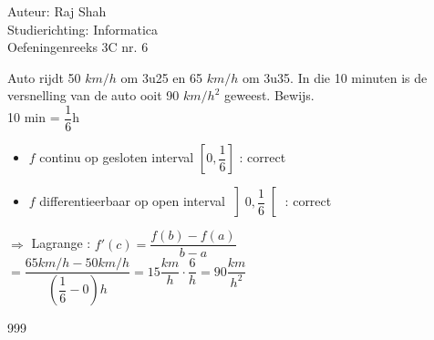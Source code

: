 \documentclass[a4paper]{article}
\begin{document}
  
\noindent \large Auteur: Raj Shah \\
\noindent \large Studierichting: Informatica\\
\noindent \large Oefeningenreeks 3C nr. 6\\

\medskip

\normalsize

Auto rijdt 50 $km/h$ om 3u25 en 65 $km/h$ om 3u35. In die 10 minuten is de versnelling van de auto ooit 90 $km/h^2$ geweest. Bewijs.\\

10 min = $\dfrac{1}{6}$h\\

\begin{itemize}
	\item $f$ continu op gesloten interval $\left[0, \dfrac{1}{6} \right]$ : correct
	\item $f$ differentieerbaar op open interval $\left]0, \dfrac{1}{6}\right[ $ : correct
\end{itemize}

$\Rightarrow$ Lagrange : $f'(c) = \dfrac{f(b) - f(a)}{b-a}$\\

$ = \dfrac{65 km/h - 50 km/h}{\left(\dfrac{1}{6} - 0\right)h} = 15 \dfrac{km}{h} \cdot \dfrac{6}{h}  =  90 \dfrac{km}{h^2} $ 

\begin{thebibliography}{999}
\end{thebibliography}
\end{document}
